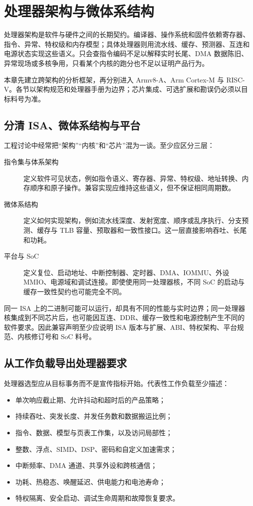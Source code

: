 \chapter{处理器架构与微体系结构}
\label{chap:micro-architecture}

处理器架构是软件与硬件之间的长期契约。编译器、操作系统和固件依赖寄存器、指令、异常、特权级和内存模型；具体处理器则用流水线、缓存、预测器、互连和电源状态实现这些语义。只会查指令编码不足以解释实时长尾、DMA 数据陈旧、异常现场或多核争用，只看某个内核的跑分也不足以证明产品行为。

本章先建立跨架构的分析框架，再分别进入 Armv8-A、Arm Cortex-M 与 RISC-V。各节以架构规范和处理器手册为边界\cite{armpg,armv8m-architecture,riscvspec,riscvpri}；芯片集成、可选扩展和勘误仍必须以目标料号为准。

\section{分清 ISA、微体系结构与平台}

工程讨论中经常把“架构”“内核”和“芯片”混为一谈。至少应区分三层：
\begin{description}
  \item[指令集与体系架构] 定义软件可见状态，例如指令语义、寄存器、异常、特权级、地址转换、内存顺序和原子操作。兼容实现应维持这些语义，但不保证相同周期数。
  \item[微体系结构] 定义如何实现架构，例如流水线深度、发射宽度、顺序或乱序执行、分支预测、缓存与 TLB 容量、预取器和一致性接口。这一层直接影响吞吐、长尾和功耗。
  \item[平台与 SoC] 定义复位、启动地址、中断控制器、定时器、DMA、IOMMU、外设 MMIO、电源域和调试连接。即使使用同一处理器核，不同 SoC 的启动与缓存一致性契约也可能完全不同。
\end{description}

同一 ISA 上的二进制可能可以运行，却具有不同的性能与实时边界；同一处理器核集成到不同芯片后，也可能因互连、DDR、缓存一致性和电源控制产生不同的软件要求。因此兼容声明至少应说明 ISA 版本与扩展、ABI、特权架构、平台规范、内核修订号和 SoC 料号。

\section{从工作负载导出处理器要求}

处理器选型应从目标事务而不是宣传指标开始。代表性工作负载至少描述：
\begin{itemize}
  \item 单次响应截止期、允许抖动和超时后的产品策略；
  \item 持续吞吐、突发长度、并发任务数和数据搬运比例；
  \item 指令、数据、模型与页表工作集，以及访问局部性；
  \item 整数、浮点、SIMD、DSP、密码和自定义加速需求；
  \item 中断频率、DMA 通道、共享外设和跨核通信；
  \item 功耗、热稳态、唤醒延迟、供电能力和电池寿命；
  \item 特权隔离、安全启动、调试生命周期和故障恢复要求。
\end{itemize}

